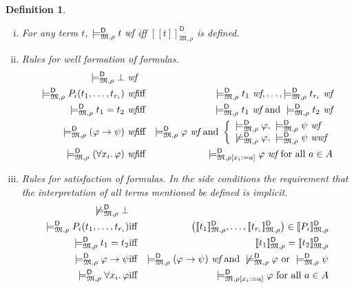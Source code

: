 \documentclass{article}
\newtheorem{definition}{Definition}[section]
\newcommand{\wf}{\ \mbox{\em wf}}
\newcommand{\wwf}{\ \mbox{\em wwf}}
\newcommand{\ints}[4]{\ensuremath{[\![{#4}]\!]^{\mathsf{#1}}_{\mathfrak{#2},{#3}}}}
\newcommand{\mymodelss}[3]{\ensuremath{\models_{\mathfrak{#2},{#3}}^{\mathsf{#1}}}}
\def\sep{.\,}
\begin{document}
\begin{definition}
\begin{enumerate}[(i)]
\begin{eqnarray*}
\mymodelss{D}M\rho\bot\wwf \\
\mymodelss{D}M\rho P_i(t_1,\ldots,t_{r_i})\wwf & \mbox{iff} &
 \mymodelss{D}M\rho{t_1}\wwf,\ldots,\mymodelss{D}M\rho{t_{r_i}}\wwf \\
\mymodelss{D}M\rho t_1=t_2\wwf & \mbox{iff} &
 \mymodelss{D}M\rho{t_1}\wwf\mbox{ and }\mymodelss{D}M\rho{t_2}\wwf \\
\mymodelss{D}M\rho(\varphi\to\psi)\wwf & \mbox{iff} &
 \mymodelss{D}M\rho\varphi\wwf\mbox{ and } \mymodelss{D}M\rho\psi\wwf \\
\mymodelss{D}M\rho(\forall x_i\sep\varphi)\wwf & \mbox{iff} &
 \mymodelss{D}M{\rho[x_i:=a]}\varphi\wwf \mbox{ for all $a\in A$}
\end{eqnarray*}
\item For any term $t$, $\mymodelss{D}M\rho t\wf$ iff $\ints{D}M\rho t$ is
defined.
\item Rules for well formation of formulas.
\begin{eqnarray*}
\mymodelss{D}M\rho\bot\wf \\
\mymodelss{D}M\rho P_i(t_1,\ldots,t_{r_i})\wf & \mbox{iff} &
 \mymodelss{D}M\rho{t_1}\wf,\ldots,\mymodelss{D}M\rho{t_{r_i}}\wf \\
\mymodelss{D}M\rho t_1=t_2\wf & \mbox{iff} &
 \mymodelss{D}M\rho{t_1}\wf\mbox{ and }\mymodelss{D}M\rho{t_2}\wf \\
\mymodelss{D}M\rho(\varphi\to\psi)\wf & \mbox{iff} &
 \mymodelss{D}M\rho\varphi\wf\mbox{ and }
 \left\{\begin{array}{l}
 \mymodelss{D}M\rho\varphi,\ \mymodelss{D}M\rho\psi\wf \\
 \not\mymodelss{D}M\rho\varphi,\ \mymodelss{D}M\rho\psi\wwf
 \end{array}\right. \\
\mymodelss{D}M\rho(\forall x_i\sep\varphi)\wf & \mbox{iff} &
 \mymodelss{D}M{\rho[x_i:=a]}\varphi\wf \mbox{ for all $a\in A$}
\end{eqnarray*}
\item Rules for satisfaction of formulas.  In the side conditions the
requirement that the interpretation of all terms mentioned be defined
is implicit.
\begin{eqnarray*}
\not\mymodelss{D}M\rho\bot \\
\mymodelss{D}M\rho P_i(t_1,\ldots,t_{r_i}) & \mbox{iff} &
 \left(\ints{D}M\rho{t_1},\ldots,\ints{D}M\rho{t_{r_i}}\right)
  \in\ints{D}M\rho{P_i} \\
\mymodelss{D}M\rho t_1=t_2 & \mbox{iff} &
 \ints{D}M\rho{t_1}=\ints{D}M\rho{t_2} \\
\mymodelss{D}M\rho\varphi\to\psi & \mbox{iff} &
 \mymodelss{D}M\rho(\varphi\to\psi)\wf \mbox{ and }
 \not\mymodelss{D}M\rho\varphi \mbox{ or } \mymodelss{D}M\rho\psi \\
\mymodelss{D}M\rho\forall x_i\sep\varphi & \mbox{iff} &
 \mymodelss{D}M{\rho[x_i:=a]}\varphi \mbox{ for all $a\in A$}
\end{eqnarray*}
\end{enumerate}
\end{definition}
\end{document}
